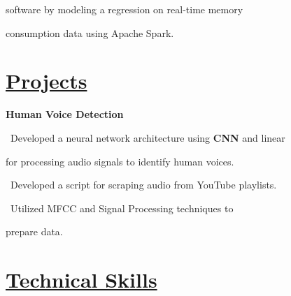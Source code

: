 \documentclass{article}
\begin{document}
\begin{minipage}[t][0pt]{8in\linewidth}
\begin{minipage}[t]{0.45\textwidth\hspace{0in}}
\begin{minipage}[t]{3.75in\textwidth\hspace{0in}}
            \hspace{1.6em} software by modeling a regression on real-time memory 
            
            \hspace{1.6em} consumption data using Apache Spark.
        \end{minipage}

        \vspace{-1.5em}
        \section{\underline{Projects}}
        \begin{minipage}[t]{3.75in\textwidth\hspace{0in}}

            \vspace{-1em}
            \mdseries\bfseries{Human Voice Detection}            
            
            \vspace{0em}
            \small\mdseries
            \hspace{1em}\textasteriskcentered \, \frenchspacing\mdseries\textrm{Developed a neural network architecture using \textbf{CNN} and linear} 
            
            \frenchspacing\hspace{2em}\layers for processing audio signals to identify human voices.

            \vspace{0.6em}
            \hspace{1em}\textasteriskcentered \, \frenchspacing\mdseries\textrm{Developed a script for scraping audio from YouTube playlists.}
            
            \vspace{0.6em}
            \hspace{1em}\textasteriskcentered \, \frenchspacing\mdseries\textrm{Utilized MFCC and Signal Processing techniques to} 
            
            \hspace{1.7em} prepare data.

        \end{minipage}

\end{minipage}
    \begin{minipage}[t]{3.1in\linewidth\hspace{2.8em}}
    \section{\underline{Technical Skills}}
    \vspace{-0.7em}

\end{minipage}
\end{minipage}
\end{document}
